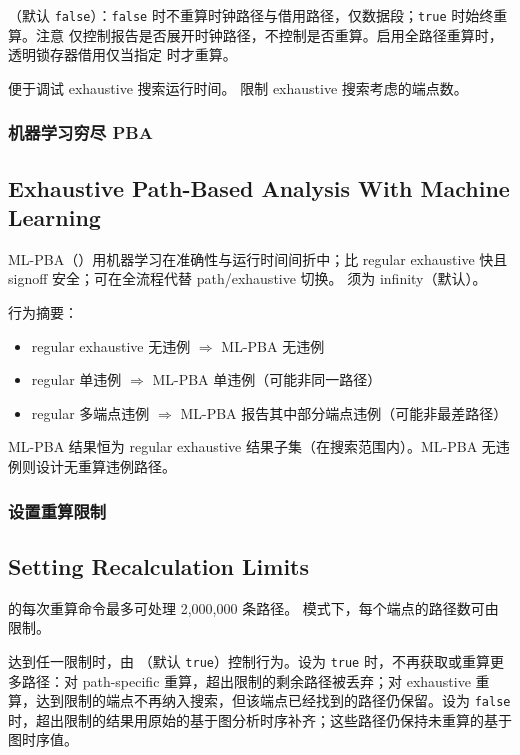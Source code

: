 （默认 \texttt{false}）：\texttt{false} 时不重算时钟路径与借用路径，仅数据段；\texttt{true} 时始终重算。注意  仅控制报告是否展开时钟路径，不控制是否重算。启用全路径重算时，透明锁存器借用仅当指定  时才重算。

 便于调试 exhaustive 搜索运行时间。 限制 exhaustive 搜索考虑的端点数。

\subsubsection{机器学习穷尽 PBA}
\subsection*{Exhaustive Path-Based Analysis With Machine Learning}

ML-PBA（）用机器学习在准确性与运行时间间折中；比 regular exhaustive 快且 signoff 安全；可在全流程代替 path/exhaustive 切换。 须为 infinity（默认）。

行为摘要：
\begin{itemize}
  \item regular exhaustive 无违例 $\Rightarrow$ ML-PBA 无违例
  \item regular 单违例 $\Rightarrow$ ML-PBA 单违例（可能非同一路径）
  \item regular 多端点违例 $\Rightarrow$ ML-PBA 报告其中部分端点违例（可能非最差路径）
\end{itemize}

ML-PBA 结果恒为 regular exhaustive 结果子集（在搜索范围内）。ML-PBA 无违例则设计无重算违例路径。

\subsubsection{设置重算限制}
\subsection*{Setting Recalculation Limits}

 的每次重算命令最多可处理 2{,}000{,}000 条路径。 模式下，每个端点的路径数可由  限制。

达到任一限制时，由 （默认 \texttt{true}）控制行为。设为 \texttt{true} 时，不再获取或重算更多路径：对 path-specific 重算，超出限制的剩余路径被丢弃；对 exhaustive 重算，达到限制的端点不再纳入搜索，但该端点已经找到的路径仍保留。设为 \texttt{false} 时，超出限制的结果用原始的基于图分析时序补齐；这些路径仍保持未重算的基于图时序值。

